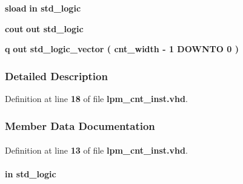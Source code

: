 \begin{DoxyCompactItemize}
{\bf sload}  {\bfseries {\bfseries \textcolor{keywordflow}{in}\textcolor{vhdlchar}{ }}} {\bfseries \textcolor{comment}{std\+\_\+logic}\textcolor{vhdlchar}{ }} 
\item 
{\bf cout}  {\bfseries {\bfseries \textcolor{keywordflow}{out}\textcolor{vhdlchar}{ }}} {\bfseries \textcolor{comment}{std\+\_\+logic}\textcolor{vhdlchar}{ }} 
\item 
{\bf q}  {\bfseries {\bfseries \textcolor{keywordflow}{out}\textcolor{vhdlchar}{ }}} {\bfseries \textcolor{comment}{std\+\_\+logic\+\_\+vector}\textcolor{vhdlchar}{ }\textcolor{vhdlchar}{(}\textcolor{vhdlchar}{ }\textcolor{vhdlchar}{ }\textcolor{vhdlchar}{ }\textcolor{vhdlchar}{ }{\bfseries {\bf cnt\+\_\+width}} \textcolor{vhdlchar}{-\/}\textcolor{vhdlchar}{ } \textcolor{vhdldigit}{1} \textcolor{vhdlchar}{ }\textcolor{keywordflow}{D\+O\+W\+N\+TO}\textcolor{vhdlchar}{ }\textcolor{vhdlchar}{ } \textcolor{vhdldigit}{0} \textcolor{vhdlchar}{ }\textcolor{vhdlchar}{)}\textcolor{vhdlchar}{ }} 
\end{DoxyCompactItemize}


\subsubsection{Detailed Description}


Definition at line {\bf 18} of file {\bf lpm\+\_\+cnt\+\_\+inst.\+vhd}.



\subsubsection{Member Data Documentation}
\paragraph[{ all }]{\hspace{0.3cm}{\ttfamily [Package]}}\label{classlpm__cnt__inst_a470a86ce8776f637b0483eabf2d92ad2}


Definition at line {\bf 13} of file {\bf lpm\+\_\+cnt\+\_\+inst.\+vhd}.

\paragraph[{cin}]{ {\bfseries \textcolor{keywordflow}{in}\textcolor{vhdlchar}{ }} {\bfseries \textcolor{comment}{std\+\_\+logic}\textcolor{vhdlchar}{ }} \hspace{0.3cm}{\ttfamily [Port]}}\label{classlpm__cnt__inst_a04579920015c13db6350045542d414aa}



